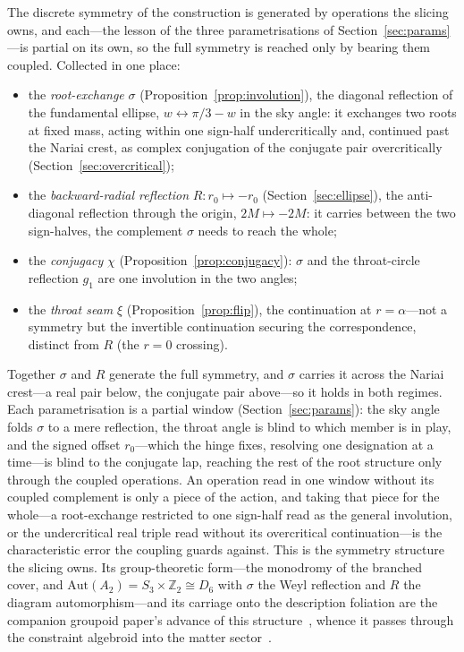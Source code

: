 \documentclass[11pt,a4paper]{article}
\theoremstyle{definition}
\begin{document}
The discrete symmetry of the construction is generated by operations the slicing owns, and each---the lesson of the three parametrisations of Section~\ref{sec:params}---is partial on its own, so the full symmetry is reached only by bearing them coupled. Collected in one place:
\begin{itemize}
\item the \emph{root-exchange} $\sigma$ (Proposition~\ref{prop:involution}), the diagonal reflection of the fundamental ellipse, $w\leftrightarrow\pi/3-w$ in the sky angle: it exchanges two roots at fixed mass, acting within one sign-half undercritically and, continued past the Nariai crest, as complex conjugation of the conjugate pair overcritically (Section~\ref{sec:overcritical});
\item the \emph{backward-radial reflection} $R:r_{0}\mapsto-r_{0}$ (Section~\ref{sec:ellipse}), the anti-diagonal reflection through the origin, $2M\mapsto-2M$: it carries between the two sign-halves, the complement $\sigma$ needs to reach the whole;
\item the \emph{conjugacy} $\chi$ (Proposition~\ref{prop:conjugacy}): $\sigma$ and the throat-circle reflection $g_{1}$ are one involution in the two angles;
\item the \emph{throat seam} $\xi$ (Proposition~\ref{prop:flip}), the continuation at $r=\alpha$---not a symmetry but the invertible continuation securing the correspondence, distinct from $R$ (the $r=0$ crossing).
\end{itemize}
Together $\sigma$ and $R$ generate the full symmetry, and $\sigma$ carries it across the Nariai crest---a real pair below, the conjugate pair above---so it holds in both regimes. Each parametrisation is a partial window (Section~\ref{sec:params}): the sky angle folds $\sigma$ to a mere reflection, the throat angle is blind to which member is in play, and the signed offset $r_{0}$---which the hinge fixes, resolving one designation at a time---is blind to the conjugate lap, reaching the rest of the root structure only through the coupled operations. An operation read in one window without its coupled complement is only a piece of the action, and taking that piece for the whole---a root-exchange restricted to one sign-half read as the general involution, or the undercritical real triple read without its overcritical continuation---is the characteristic error the coupling guards against. This is the symmetry structure the slicing owns. Its group-theoretic form---the
monodromy of the branched cover, and $\mathrm{Aut}(A_{2})=S_{3}\times\mathbb{Z}_{2}\cong D_{6}$ with $\sigma$ the Weyl reflection and $R$ the diagram automorphism---and its carriage onto the description foliation are the companion groupoid paper's advance of this structure~\cite{JanzenGroupoid}, whence it passes through the constraint algebroid into the matter sector~\cite{JanzenBoundary}.
\end{document}
